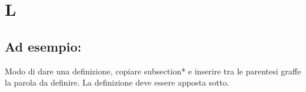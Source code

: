 \section*{L}
\markright{}
\subsection*{Ad esempio:}
Modo di dare una definizione, copiare subsection*{} e inserire tra le parentesi graffe la parola da definire. La definizione deve essere apposta sotto.